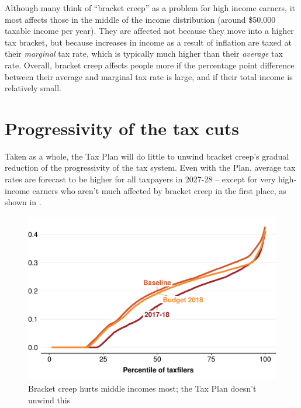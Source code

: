 \documentclass[submission]{grattan}
\newenvironment{knitrout}{}{} %
\begin{document}
Although many think of ``bracket creep'' as a problem for high income earners, it most affects those in the middle of the income distribution (around \$50,000 taxable income per year). They are affected not because they move into a higher tax bracket, but because increases in income as a result of inflation are taxed at their \emph{marginal} tax rate, which is typically much higher than their \emph{average} tax rate. Overall, bracket creep affects people more if the percentage point difference between their average and marginal tax rate is large, and if their total income is relatively small.


\section{Progressivity of the tax cuts}\label{sec:progressivity-of-the-tax-cuts}

Taken as a whole, the Tax Plan will do little to unwind bracket creep's gradual reduction of the progressivity of the tax system. Even with the Plan, average tax rates are forecast to be higher for all taxpayers in 2027-28 -- except for very high-income earners who aren't much affected by bracket creep in the first place, as shown in .

\begin{figure}
\caption{Bracket creep hurts middle incomes most; the Tax Plan doesn't unwind this}\label{fig:bracket-creep-hurts-middle-incomes-most}
\begin{knitrout}
\color{fgcolor}
\includegraphics[width=4.47222in,height=2.92631723826715in]{atlas/fig2-1} 

\end{knitrout}


\end{figure}
\end{document}
